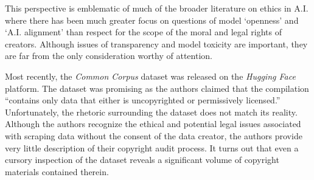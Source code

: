 This perspective is emblematic of much of the broader literature on ethics in A.I. where there has been much greater focus on questions of model ‘openness’ and `A.I. alignment' than respect for the scope of the moral and legal rights of creators.  Although issues of transparency and model toxicity are important, they are far from the only consideration worthy of attention.  

Most recently, the \textit{Common Corpus} dataset\cite{arnett2024toxicity}  was released on the \textit{Hugging Face} platform.  The dataset was promising as the authors claimed that the compilation ``contains only data that either is uncopyrighted or permissively licensed.''  Unfortunately, the rhetoric surrounding the dataset does not match its reality.  Although the authors recognize the ethical and potential legal issues associated with scraping data without the consent of the data creator, the authors provide very little description of their copyright audit process.  It turns out that even a cursory inspection of the dataset reveals a significant volume of copyright materials contained therein. 







